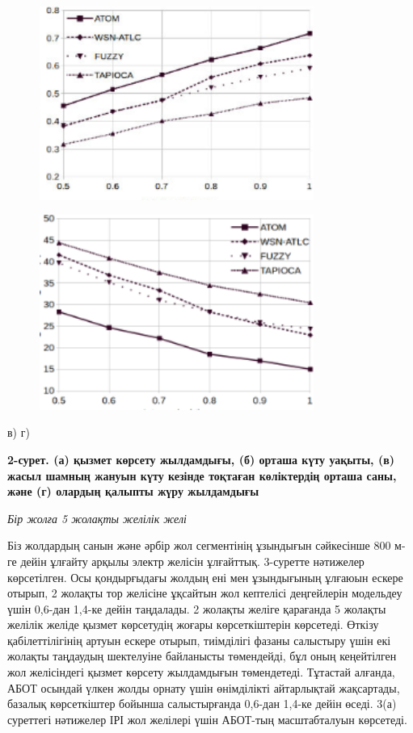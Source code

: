 \begin{figure}[H]
	\centering
	\includegraphics[width=0.8\textwidth]{assets/159}
	\caption*{}
\end{figure}
\begin{figure}[H]
	\centering
	\includegraphics[width=0.8\textwidth]{assets/160}
	\caption*{}
\end{figure}

в) г)

{\bfseries 2-сурет. (а) қызмет көрсету жылдамдығы, (б) орташа күту уақыты,
(в) жасыл шамның жануын күту кезінде тоқтаған көліктердің орташа саны,
және (г) олардың қалыпты жүру жылдамдығы}

\emph{Бір жолға 5 жолақты желілік желі}

Біз жолдардың санын және әрбір жол сегментінің ұзындығын сәйкесінше 800
м-ге дейін ұлғайту арқылы электр желісін ұлғайттық. 3-суретте нәтижелер
көрсетілген. Осы қондырғыдағы жолдың ені мен ұзындығының ұлғаюын ескере
отырып, 2 жолақты тор желісіне ұқсайтын жол кептелісі деңгейлерін
модельдеу үшін 0,6-дан 1,4-ке дейін таңдалады. 2 жолақты желіге
қарағанда 5 жолақты желілік желіде қызмет көрсетудің жоғары
көрсеткіштерін көрсетеді. Өткізу қабілеттілігінің артуын ескере отырып,
тиімділігі фазаны салыстыру үшін екі жолақты таңдаудың шектелуіне
байланысты төмендейді, бұл оның кеңейтілген жол желісіндегі қызмет
көрсету жылдамдығын төмендетеді. Тұтастай алғанда, АБОТ осындай үлкен
жолды орнату үшін өнімділікті айтарлықтай жақсартады, базалық
көрсеткіштер бойынша салыстырғанда 0,6-дан 1,4-ке дейін өседі. 3(а)
суреттегі нәтижелер ІРІ жол желілері үшін АБОТ-тың масштабталуын
көрсетеді.


